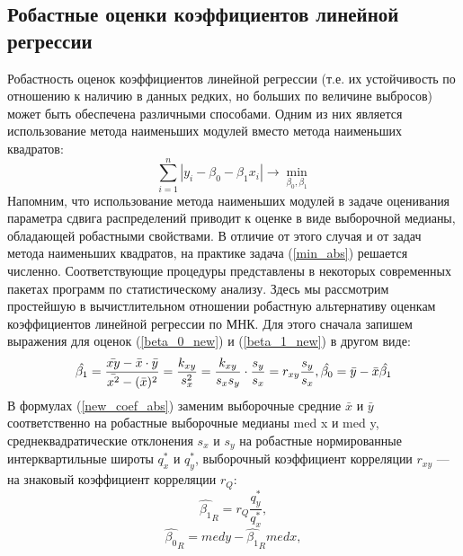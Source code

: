 \documentclass[12pt,a4paper]{scrartcl}
\begin{document}
    \subsection{Робастные оценки коэффициентов линейной регрессии}
    Робастность оценок коэффициентов линейной регрессии (т.е. их устойчивость по отношению к наличию в данных редких, но больших по величине выбросов) может быть обеспечена различными способами. Одним из них является использование метода наименьших модулей вместо метода наименьших квадратов:
    \begin{equation}
	    \sum_{i=1}^{n}{|y_{i} - \beta_{0} - \beta_{1}x_{i}|}\rightarrow \min_{\beta_{0}, \beta_{1}}
	    \label{min_abs}
	\end{equation}
    Напомним, что использование метода наименьших модулей в задаче оценивания параметра сдвига распределений приводит к оценке в виде выборочной медианы, обладающей робастными свойствами. В отличие от этого случая и от задач метода наименьших квадратов, на практике задача (\ref{min_abs}) решается численно. Соответствующие процедуры представлены в некоторых современных пакетах программ по статистическому анализу.
    \newline
    Здесь мы рассмотрим простейшую в вычистлительном отношении робастную альтернативу оценкам коэффициентов линейной регрессии по МНК. Для этого сначала запишем выражения для оценок (\ref{beta_0_new}) и (\ref{beta_1_new}) в другом виде: 
    \begin{equation}
        \hat{\beta_{1}} = \frac{\bar{xy} - \bar{x} \cdot \bar{y}}{\bar{x^{2}} - (\bar{x})^{2}} = \frac{k_{xy}}{s_{x}^{2}} = \frac{k_{xy}}{s_{x}s_{y}} \cdot \frac{s_{y}}{s_{x}} = r_{xy}\frac{s_{y}}{s_{x}},\\
        \hat{\beta_{0}} = \bar{y} - \bar{x}\hat{\beta_{1}}
        \label{new_coef_abs}
    \end{equation}
    В формулах (\ref{new_coef_abs}) заменим выборочные средние $\bar{x}$ и $\bar{y}$ соответственно на робастные выборочные медианы med x и med y, среднеквадратические отклонения $s_{x}$ и $s_{y}$ на робастные нормированные интерквартильные широты $q^{*}_{x}$ и $q^{*}_{y}$, выборочный коэффициент корреляции $r_{xy}$ — на знаковый коэффициент корреляции $r_{Q}$: 
    \begin{equation}
        \hat{\beta_{1}}_{R} = r_{Q}\frac{q^{*}_{y}}{q^{*}_{x}},
        \label{b_1R}
    \end{equation}
    \begin{equation}
        \hat{\beta_{0}}_{R} = med y - \hat{\beta_{1}}_{R} med x,
        \label{b_0R}
    \end{equation}
\end{document}
